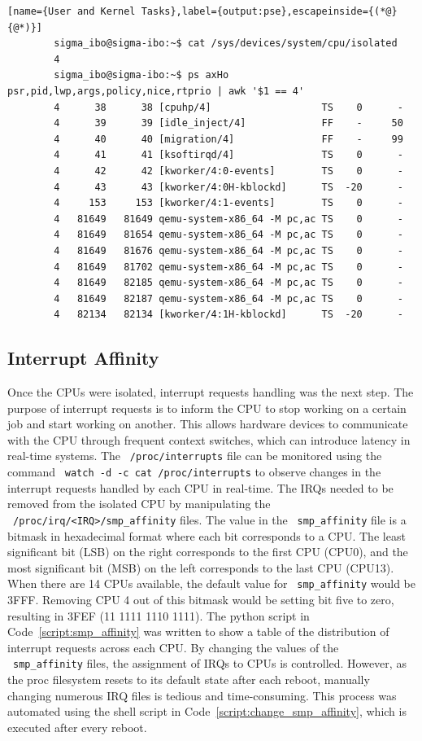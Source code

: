 \documentclass[MMR,Master,english]{twbook}
\begin{document}
\vspace{1em}
\begin{minipage}{0.95\columnwidth}
	\begin{lstlisting}[name={User and Kernel Tasks},label={output:pse},escapeinside={(*@}{@*)}]
		sigma_ibo@sigma-ibo:~$ cat /sys/devices/system/cpu/isolated
		4
		sigma_ibo@sigma-ibo:~$ ps axHo psr,pid,lwp,args,policy,nice,rtprio | awk '$1 == 4'
		4      38      38 [cpuhp/4]                   TS    0      -
		4      39      39 [idle_inject/4]             FF    -     50
		4      40      40 [migration/4]               FF    -     99
		4      41      41 [ksoftirqd/4]               TS    0      -
		4      42      42 [kworker/4:0-events]        TS    0      -
		4      43      43 [kworker/4:0H-kblockd]      TS  -20      -
		4     153     153 [kworker/4:1-events]        TS    0      -
		4   81649   81649 qemu-system-x86_64 -M pc,ac TS    0      -
		4   81649   81654 qemu-system-x86_64 -M pc,ac TS    0      -
		4   81649   81676 qemu-system-x86_64 -M pc,ac TS    0      -
		4   81649   81702 qemu-system-x86_64 -M pc,ac TS    0      -
		4   81649   82185 qemu-system-x86_64 -M pc,ac TS    0      -
		4   81649   82187 qemu-system-x86_64 -M pc,ac TS    0      -
		4   82134   82134 [kworker/4:1H-kblockd]      TS  -20      -
\end{lstlisting}
\end{minipage}
\subsection{Interrupt Affinity}\label{subsec:irq_handling}
Once the CPUs were isolated, interrupt requests handling was the next step. The purpose of interrupt requests is to inform the CPU to stop working on a certain job and start working on another. This allows hardware devices to communicate with the CPU through frequent context switches, which can introduce latency in real-time systems. The ~\texttt{/proc/interrupts} file can be monitored using the command ~\texttt{watch -d -c cat /proc/interrupts} to observe changes in the interrupt requests handled by each CPU in real-time. The IRQs needed to be removed from the isolated CPU by manipulating the ~\texttt{/proc/irq/<IRQ>/smp\_affinity} files. The value in the ~\texttt{smp\_affinity} file is a bitmask in hexadecimal format where each bit corresponds to a CPU. The least significant bit (LSB) on the right corresponds to the first CPU (CPU0), and the most significant bit (MSB) on the left corresponds to the last CPU (CPU13). When there are 14 CPUs available, the default value for ~\texttt{smp\_affinity} would be 3FFF. Removing CPU 4 out of this bitmask would be setting bit five to zero, resulting in 3FEF (11 1111 1110 1111). The python script in Code~\ref{script:smp_affinity} was written to show a table of the distribution of interrupt requests across each CPU. By changing the values of the ~\texttt{smp\_affinity} files, the assignment of IRQs to CPUs is controlled. However, as the proc filesystem resets to its default state after each reboot, manually changing numerous IRQ files is tedious and time-consuming. This process was automated using the shell script in Code~\ref{script:change_smp_affinity}, which is executed after every reboot.
\end{document}
